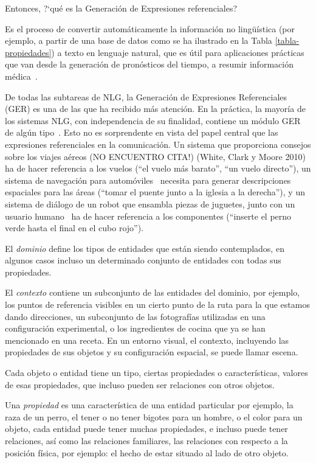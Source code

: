 Entonces,  ?`qu\'e es la Generaci\'on de Expresiones referenciales? 

Es el proceso de convertir autom\'aticamente la informaci\'on no ling\"u\'{i}stica (por ejemplo, a partir de una base de datos como se ha ilustrado en la Tabla \ref{tabla-propiedades}) a texto en lenguaje natural, que es \'util para aplicaciones pr\'acticas que van desde la generaci\'on de pron\'osticos del tiempo, a resumir informaci\'on m\'edica~\cite{dale2000}.

De todas las subtareas de NLG, la Generaci\'on de Expresiones Referenciales (GER) es
una de las que ha recibido m\'as atenci\'on. En la pr\'actica, la mayor\'ia de los
sistemas NLG, con independencia de su finalidad, contiene un m\'odulo GER de alg\'un tipo~\cite{Mellish2004}. Esto no es sorprendente
en vista del papel central que las expresiones referenciales en la comunicaci\'on. Un sistema que proporciona
consejos sobre los viajes a\'ereos (NO ENCUENTRO CITA!) (White, Clark y Moore 2010) ha de hacer referencia a los vuelos (``el
vuelo m\'as barato'', ``un vuelo directo''), un sistema de navegaci\'on para autom\'oviles~\cite{Drager:2012:GLN:2380816.2380908}
necesita para generar descripciones espaciales para las \'areas (``tomar el puente junto a la iglesia a la derecha''),
y un sistema de di\'alogo de un robot que ensambla piezas de juguetes, junto con un usuario humano~\cite{foster-etal-ijcai2009} ha de hacer referencia a los componentes (``inserte el perno verde hasta el final en el cubo rojo'').

El {\it dominio} define los tipos de entidades que est\'an siendo contemplados, en algunos
casos incluso un determinado conjunto de entidades con todas sus propiedades.

El {\it contexto} contiene un subconjunto de las entidades del dominio, por ejemplo, los puntos de referencia visibles en un cierto punto de la ruta para la que estamos dando direcciones, un subconjunto de las fotograf\'ias utilizadas en una configuraci\'on experimental, o los ingredientes de cocina que ya se han mencionado en una receta. En un entorno visual, el contexto, incluyendo las
propiedades de sus objetos y su configuraci\'on espacial, se puede llamar escena. 

Cada objeto o entidad tiene un tipo, ciertas propiedades o caracter\'isticas, valores de esas propiedades, que incluso pueden ser relaciones con otros objetos.

Una {\it propiedad} es una caracter\'istica de una entidad particular por ejemplo, la raza de un perro, el tener o no tener bigotes para un hombre, o el color para un objeto, cada entidad puede tener muchas propiedades, e incluso puede tener relaciones, as\'i como las relaciones familiares, las relaciones con respecto a la posici\'on f\'isica, por ejemplo: el hecho de estar situado al lado de otro objeto.

